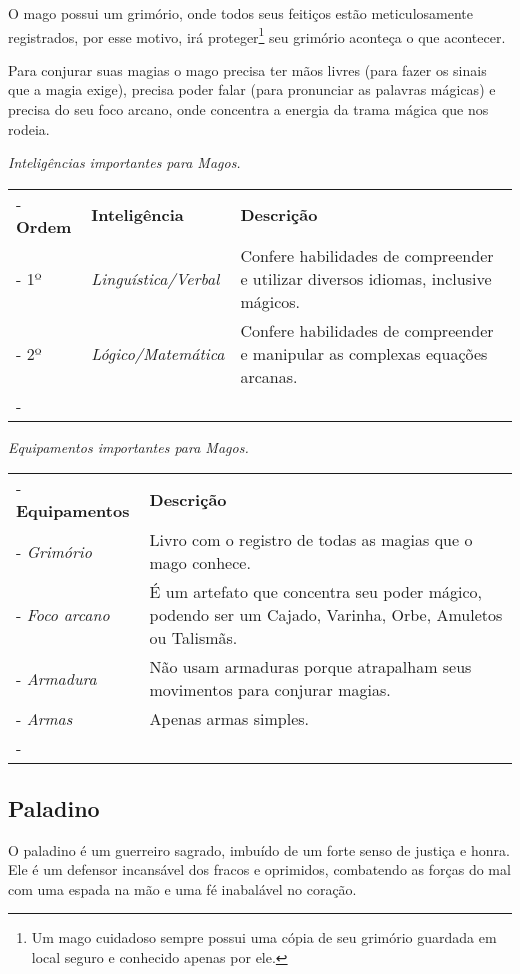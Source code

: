 O mago possui um grimório, onde todos seus feitiços estão meticulosamente registrados, por esse motivo, irá proteger\footnote{Um mago cuidadoso sempre possui uma cópia de seu grimório guardada em local seguro e conhecido apenas por ele.} seu grimório aconteça o que acontecer.

Para conjurar suas magias o mago precisa ter mãos livres (para fazer os sinais que a magia exige), precisa poder falar (para pronunciar as palavras mágicas) e precisa do seu foco arcano, onde concentra a energia da trama mágica que nos rodeia.

\begin{table}[htb]
	\centering\smaller
	\emph{Inteligências importantes para Magos.} \\
	\begin{tabu} to \textwidth {|X[c 0.5]|X[1]|X[3]|} \tabucline-
		\textbf{Ordem}	& \textbf{Inteligência}	&	\textbf{Descrição}	\\ \tabucline-
		1º		& \emph{Linguística/Verbal}  	& Confere habilidades de compreender e utilizar diversos idiomas, inclusive mágicos. 	\\ \tabucline-
		2º		& \emph{Lógico/Matemática} & Confere habilidades de compreender e manipular as complexas equações arcanas.\\ \tabucline-
	\end{tabu}
\end{table}

\begin{table}[htb]
	\centering\smaller
	\emph{Equipamentos importantes para Magos.}
	\begin{tabu} to \textwidth {|X[0.5]|X[3]|} \tabucline-
		\textbf{Equipamentos}	&	\textbf{Descrição}	\\ \tabucline-
		\emph{Grimório} & Livro com o registro de todas as magias que o mago conhece.	\\ \tabucline-
		\emph{Foco arcano} & É um artefato que concentra seu poder mágico, podendo ser um Cajado, Varinha, Orbe, Amuletos ou Talismãs. \\ \tabucline-
		\emph{Armadura} & Não usam armaduras porque atrapalham seus movimentos para conjurar magias. \\ \tabucline-
		\emph{Armas} & Apenas armas simples. \\ \tabucline-
	\end{tabu}
\end{table}


\subsection*{Paladino}
O paladino é um guerreiro sagrado, imbuído de um forte senso de justiça e honra. Ele é um defensor incansável dos fracos e oprimidos, combatendo as forças do mal com uma espada na mão e uma fé inabalável no coração. 

